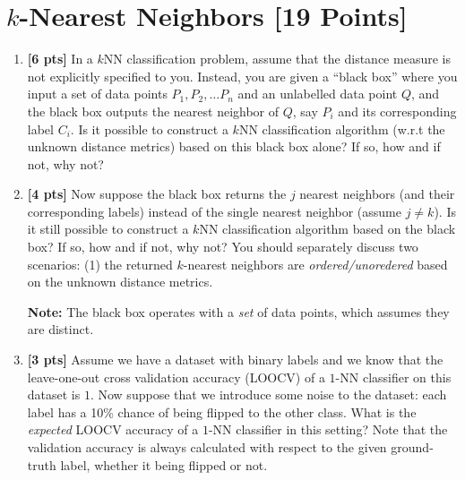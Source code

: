 \section{$k$-Nearest Neighbors [19 Points]}

\begin{enumerate}

        \item \textbf{[6 pts]} In a $k$NN classification problem, assume that the distance measure is not explicitly specified to you. Instead, you are given a “black box” where you input a set of data points $P_1, P_2, \dots P_n$ and an unlabelled data point $Q$, and the black box outputs the nearest neighbor of $Q$, say $P_i$ and its corresponding label $C_i$. Is it possible to construct a $k$NN classification algorithm (w.r.t the unknown distance metrics) based on this black box alone? If so, how and if not, why not?
        \begin{tcolorbox}[fit,height=7cm, width=0.9\textwidth, blank, borderline={1pt}{-2pt}]
        \end{tcolorbox}
        
        \item \textbf{[4 pts]} Now suppose the black box returns the $j$ nearest neighbors (and their corresponding labels) instead of the single nearest neighbor (assume $j \neq k$). Is it still possible to construct a $k$NN classification algorithm based on the black box? If so, how and if not, why not? You should separately discuss two scenarios: (1) the returned $k$-nearest neighbors are \emph{ordered/unoredered} based on the unknown distance metrics.  

        \textbf{Note:} The black box operates with a \emph{set} of data points, which assumes they are distinct.
        \begin{tcolorbox}[fit,height=7cm, width=0.9\textwidth, blank, borderline={1pt}{-2pt}]
        \end{tcolorbox}
        
\newpage
        \item \textbf{[3 pts]} Assume we have a dataset with binary labels and we know that the leave-one-out cross validation accuracy (LOOCV) of a $1$-NN classifier on this dataset is $1$. Now suppose that we introduce some noise to the dataset: each label has a 10\% chance of being flipped to the other class. What is the \emph{expected} LOOCV accuracy of a $1$-NN classifier in this setting? Note that the validation accuracy is always calculated with respect to the given ground-truth label, whether it being flipped or not. 
        


\end{enumerate}
